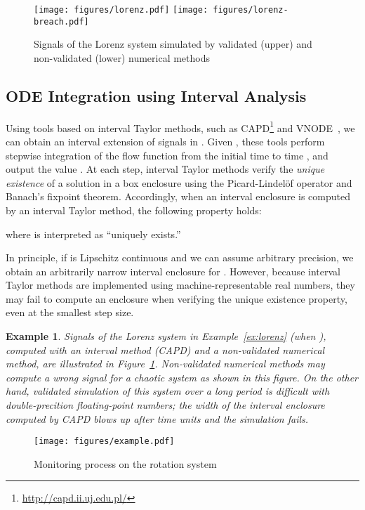 \documentclass[paper]{ieice}
\newtheorem{example}{Example}
\begin{document}
\begin{figure}[th]
\centering
\texttt{[image: figures/lorenz.pdf]}
\texttt{[image: figures/lorenz-breach.pdf]}
\caption{Signals of the Lorenz system simulated by validated (upper) and non-validated (lower) numerical methods}
\label{f:lorenz}
\end{figure}


\subsection{ODE Integration using Interval Analysis}
\label{s:ode}

Using tools based on interval Taylor methods, such as CAPD\footnote{\url{http://capd.ii.uj.edu.pl/}} and VNODE~\cite{Nedialkov2006}, we can obtain an interval extension  of signals in .
Given , these tools perform stepwise integration of the flow function  from the initial time  to time , and output the value .
At each step, interval Taylor methods verify the \emph{unique existence} of a solution in a box enclosure using the Picard-Lindel\"{o}f operator and Banach's fixpoint theorem.
Accordingly, when an interval enclosure  is computed by an interval Taylor method, the following property holds:

where  is interpreted as ``uniquely exists.''

In principle, if  is Lipschitz continuous and we can assume arbitrary precision, we obtain an arbitrarily narrow interval enclosure  for .
However, because interval Taylor methods are implemented using machine-representable real numbers, they may fail to compute an enclosure when verifying the unique existence property, even at the smallest step size.

\begin{example} \label{ex:lorenz:sig}
	Signals of the Lorenz system in Example~\ref{ex:lorenz} (when ), computed with an interval method (CAPD) and a non-validated numerical method, are illustrated in Figure~\ref{f:lorenz}.
	Non-validated numerical methods may compute a wrong signal for a chaotic system as shown in this figure. 
On the other hand, validated simulation of this system over a long period is difficult with double-precition floating-point numbers;
	the width of the interval enclosure computed by CAPD blows up after  time units and the simulation fails.
\end{example}

\begin{figure*}[t]
\texttt{[image: figures/example.pdf]}
\caption{Monitoring process on the rotation system}
\label{f:rotation:proc}
\end{figure*}
\end{document}
